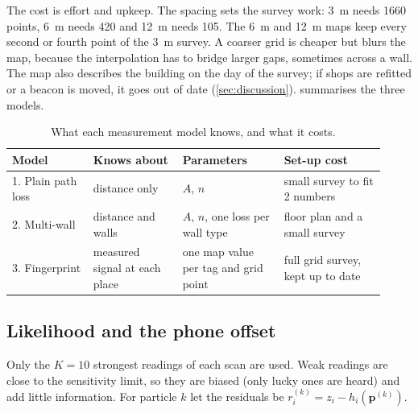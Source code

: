\documentclass[11pt,a4paper]{article}
\begin{document}
The cost is effort and upkeep. The spacing sets the survey work: \SI{3}{m} needs 1660
points, \SI{6}{m} needs 420 and \SI{12}{m} needs 105. The \SI{6}{m} and \SI{12}{m} maps
keep every second or fourth point of the \SI{3}{m} survey. A coarser grid is cheaper but
blurs the map, because the interpolation has to bridge larger gaps, sometimes across a
wall. The map also describes the building on the day of the survey; if shops are refitted
or a beacon is moved, it goes out of date (\cref{sec:discussion}).  summarises the three models.

\begin{table}[htbp]
  \centering
  \caption{What each measurement model knows, and what it costs.}
  \label{tab:models}
  \small
  \begin{tabular}{@{}p{0.2\linewidth}p{0.22\linewidth}p{0.25\linewidth}p{0.25\linewidth}@{}}
    \toprule
    Model & Knows about & Parameters & Set-up cost \\
    \midrule
    1. Plain path loss & distance only & $A$, $n$ & small survey to fit 2 numbers \\
    2. Multi-wall & distance and walls & $A$, $n$, one loss per wall type & floor plan and a small survey \\
    3. Fingerprint & measured signal at each place & one map value per tag and grid point & full grid survey, kept up to date \\
    \bottomrule
  \end{tabular}
\end{table}

\subsection{Likelihood and the phone offset}
\label{sec:likelihood}
Only the $K=10$ strongest readings of each scan are used. Weak readings are close to the
sensitivity limit, so they are biased (only lucky ones are heard) and add little
information. For particle $k$ let the residuals be
$r_i^{(k)} = z_i - h_i(\mathbf{p}^{(k)})$.
\end{document}
